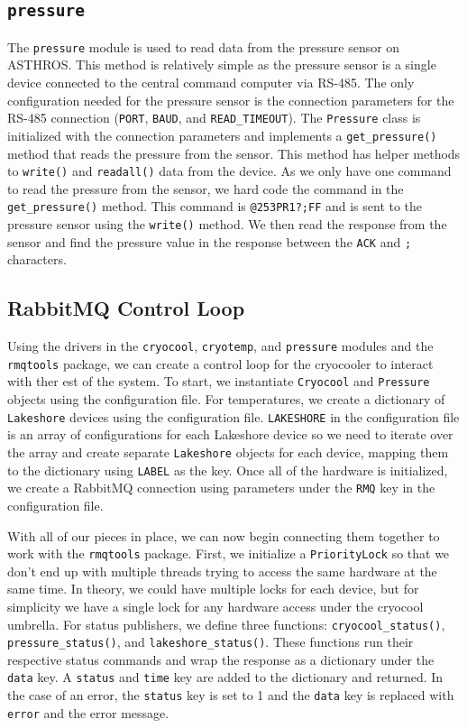 \subsection{\texttt{pressure}}
The \texttt{pressure} module is used to read data from the pressure sensor on ASTHROS.
This method is relatively simple as the pressure sensor is a single device connected to the central command computer via RS-485.
The only configuration needed for the pressure sensor is the connection parameters for the RS-485 connection (\texttt{PORT}, \texttt{BAUD}, and \texttt{READ\_TIMEOUT}).
The \texttt{Pressure} class is initialized with the connection parameters and implements a \texttt{get\_pressure()} method that reads the pressure from the sensor.
This method has helper methods to \texttt{write()} and \texttt{readall()} data from the device. 
As we only have one command to read the pressure from the sensor, we hard code the command in the \texttt{get\_pressure()} method.
This command is \texttt{@253PR1?;FF} and is sent to the pressure sensor using the \texttt{write()} method.
We then read the response from the sensor and find the pressure value in the response between the 
\texttt{ACK} and \texttt{;} characters.

\subsection{RabbitMQ Control Loop}
Using the drivers in the \texttt{cryocool}, \texttt{cryotemp}, and \texttt{pressure} modules and the \texttt{rmqtools} package, we can create a control loop for the cryocooler to interact with ther est of the system.
To start, we instantiate \texttt{Cryocool} and \texttt{Pressure} objects using the configuration file.
For temperatures, we create a dictionary of \texttt{Lakeshore} devices using the configuration file. 
\texttt{LAKESHORE} in the configuration file is an array of configurations for each Lakeshore device so we need to iterate over the array and create separate \texttt{Lakeshore} objects for each device, mapping them to the dictionary using \texttt{LABEL} as the key.
Once all of the hardware is initialized, we create a RabbitMQ connection using parameters under the \texttt{RMQ} key in the configuration file. 

With all of our pieces in place, we can now begin connecting them together to work with the \texttt{rmqtools} package.
First, we initialize a \texttt{PriorityLock} so that we don't end up with multiple threads trying to access the same hardware at the same time.
In theory, we could have multiple locks for each device, but for simplicity we have a single lock for any hardware access under the cryocool umbrella. 
For status publishers, we define three functions: \texttt{cryocool\_status()}, \texttt{pressure\_status()}, and \texttt{lakeshore\_status()}.
These functions run their respective status commands and wrap the response as a dictionary under the \texttt{data} key.
A \texttt{status} and \texttt{time} key are added to the dictionary and returned.
In the case of an error, the \texttt{status} key is set to 1 and the \texttt{data} key is replaced with \texttt{error} and the error message.

